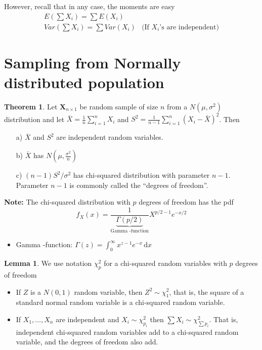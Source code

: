 \documentclass[10pt, twoside, a4paper]{book}
\newcommand{\ud}{\,\mathrm{d}}
\theoremstyle{definition}
\newtheorem{theorem}{Theorem}[chapter]
\newtheorem{lemma}{Lemma}[chapter]
\begin{document}
However, recall that in any case, the moments are easy
\begin{equation*}
\renewcommand{\arraystretch}{1.6}
\begin{array}{ll}
E(\sum X_i) = \sum E(X_i) \\
Var(\sum X_i) = \sum Var(X_i) & \text{(If $X_i$'s are independent)}
\end{array}
\end{equation*}
\section{Sampling from Normally distributed population}
\begin{theorem}
\label{theoremSumOfRVs1}
Let $\bm X_{n \times 1}$ be random sample of size $n$ from a $N(\mu, \sigma^2)$
distribution and let $\bar X = \frac{1}{n}\sum_{i=1}^n X_i$ and $S^2 =
\frac{1}{n-1}\sum_{i=1}^n(X_i-\bar X)^2$. Then
\begin{itemize}
  \item[a)] $\bar X$ and $S^2$ are independent random variables.
  \item[b)] $\bar X$ has $N(\mu, \frac{\sigma^2}{n})$
  \item[c)] $(n-1)S^2/\sigma^2$ has chi-squared distribution with parameter
  $n-1$. Parameter $n-1$ is commonly called the ``degrees of freedom''.
\end{itemize}
\end{theorem}
\textbf{Note:} The chi-squared distribution with $p$ degrees of freedom has the
pdf
$$f_X(x)= \frac{1}{\underbrace{\Gamma(p/2)}_{\text{Gamma
-function}}}X^{p/2-1}e^{-x/2}$$
\begin{itemize}
  \item Gamma -function: $\Gamma(z) = \int_0^\infty x^{z-1}e^{-x}\ud x$
\end{itemize}
\begin{lemma}
We use notation $\chi_p^2$ for a chi-squared random variables with $p$ degrees
of freedom
\begin{itemize}
  \item If $Z$ is a $N(0,1)$ random variable, then $Z^2 \sim \chi_1^2$, that is,
  the square of a standard normal random variable is a chi-squared random
  variable. %
  \item If $X_1,\ldots,X_n$ are independent and $X_i \sim \chi_{p_i}^2$ then
  $\sum X_i \sim \chi_{\sum p_i}^2$. That is, independent chi-squared random
  variables add to a chi-squared random variable, and the degrees of freedom
  also add.
\end{itemize}
\end{lemma}
\end{document}
